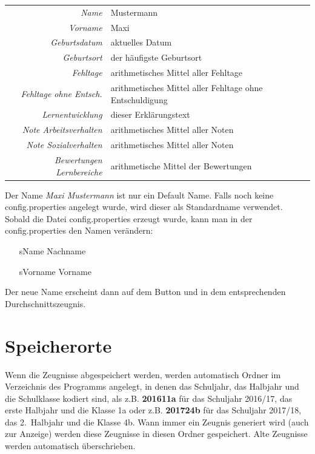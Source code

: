 \documentclass[a4paper,notitlepage,parskip]{scrartcl}
\newcommand\ott{\normalfont\ttfamily}
\begin{document}
\begin{center}
\begin{tabular}{rl}
\hline
\emph{Name}                    	& Mustermann\\
\emph{Vorname} 					& Maxi\\
\emph{Geburtsdatum} 			& aktuelles Datum\\
\emph{Geburtsort} 				& der häufigste Geburtsort\\
\emph{Fehltage} 				& arithmetisches Mittel aller Fehltage\\
\emph{Fehltage ohne Entsch.} 	& arithmetisches Mittel aller Fehltage ohne Entschuldigung\\
\emph{Lernentwicklung} 			& dieser Erklärungstext\\
\emph{Note Arbeitsverhalten} 	& arithmetisches Mittel aller Noten\\
\emph{Note Sozialverhalten} 	& arithmetisches Mittel aller Noten\\
\emph{Bewertungen Lernbereiche} & arithmetische Mittel der Bewertungen\\
\hline
\end{tabular}
\end{center}


Der Name \emph{Maxi Mustermann} ist nur ein Default Name. Falls noch keine {\ott config.properties} angelegt wurde, wird dieser als Standardname verwendet. Sobald die Datei {\ott config.properties} 
erzeugt wurde, kann man in der {\ott config.properties} den Namen verändern:

\begin{itemize}
\setlength{\itemindent}{3.5cm}
\item[sName] Nachname
\item[sVorname] Vorname
\end{itemize}

Der neue Name erscheint dann auf dem Button und in dem entsprechenden Durchschnittszeugnis.
\section{Speicherorte}
Wenn die Zeugnisse abgespeichert werden, werden automatisch Ordner im Verzeichnis des Programms angelegt, in denen das Schuljahr, das Halbjahr und die Schulklasse kodiert sind, als z.B.
{\ott\normalfont\bfseries 201611a} für das Schuljahr 2016/17, das erste Halbjahr und die Klasse 1a oder z.B. {\ott\normalfont\bfseries 201724b}
für das Schuljahr 2017/18, das 2.~Halbjahr und die Klasse 4b.
Wann immer ein Zeugnis generiert wird (auch zur Anzeige) werden diese Zeugnisse in diesen Ordner gespeichert. Alte Zeugnisse werden automatisch überschrieben.
\end{document}
